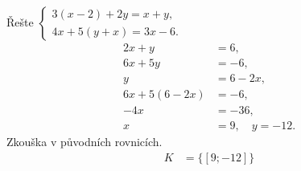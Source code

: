 \documentclass[11pt,a4paper]{article}
\begin{document}
\begin{zadaniReseniBox}[title={Rozšíření 1}]
Řešte $\begin{cases}3(x-2)+2y=x+y,\\4x+5(y+x)=3x-6.\end{cases}$
\tcblower
\[
\begin{aligned}
2x+y&=6,\\
6x+5y&=-6,\\
y&=6-2x,\\
6x+5(6-2x)&=-6,\\
-4x&=-36,\\
x&=9,\quad y=-12.
\end{aligned}
\]
Zkouška v původních rovnicích.
\[
\begin{aligned}
K &= \{[9;-12]\}
\end{aligned}
\]
\end{zadaniReseniBox}
\end{document}
